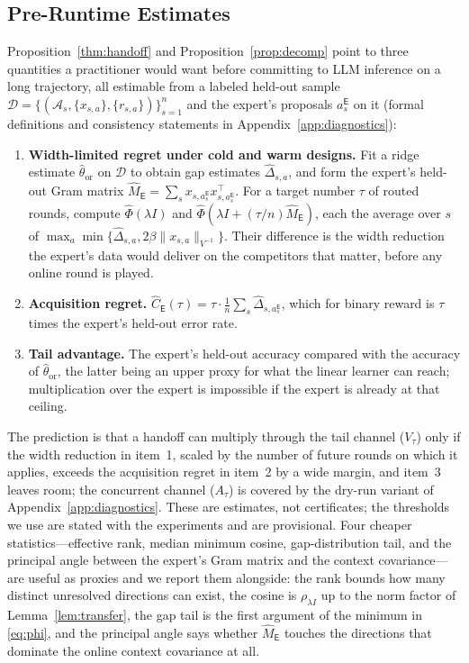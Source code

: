 \documentclass{article}
\theoremstyle{definition}
\theoremstyle{remark}
\theoremstyle{remark}
\newcommand{\Exp}{\mathsf{E}}
\begin{document}
\subsection{Pre-Runtime Estimates}
\label{sec:diagnostics}

Proposition~\ref{thm:handoff} and Proposition~\ref{prop:decomp} point to three
quantities a practitioner would want before committing to LLM inference on a
long trajectory, all estimable from a labeled held-out sample
$\mathcal D=\{(\mathcal A_s,\{x_{s,a}\},\{r_{s,a}\})\}_{s=1}^{n}$ and the
expert's proposals $a_s^{\Exp}$ on it (formal definitions and consistency
statements in Appendix~\ref{app:diagnostics}):
\begin{enumerate}[itemsep=1pt,topsep=1pt,leftmargin=*]
\item \textbf{Width-limited regret under cold and warm designs.} Fit a ridge
estimate $\widehat\theta_{\mathrm{or}}$ on $\mathcal D$ to obtain gap estimates
$\widehat\Delta_{s,a}$, and form the expert's held-out Gram matrix
$\widehat M_{\Exp}=\sum_sx_{s,a_s^{\Exp}}x_{s,a_s^{\Exp}}^\top$. For a target
number $\tau$ of routed rounds, compute
$\widehat\Phi(\lambda I)$ and $\widehat\Phi(\lambda I+(\tau/n)\widehat M_{\Exp})$,
each the average over $s$ of
$\max_a\min\{\widehat\Delta_{s,a},2\beta\|x_{s,a}\|_{V^{-1}}\}$. Their difference
is the width reduction the expert's data would deliver on the competitors
that matter, before any online round is played.
\item \textbf{Acquisition regret.} $\widehat C_{\Exp}(\tau)=\tau\cdot\frac1n\sum_s\widehat\Delta_{s,a_s^{\Exp}}$,
which for binary reward is $\tau$ times the expert's held-out error rate.
\item \textbf{Tail advantage.} The expert's held-out accuracy compared with
the accuracy of $\widehat\theta_{\mathrm{or}}$, the latter being an upper
proxy for what the linear learner can reach; multiplication over the expert
is impossible if the expert is already at that ceiling.
\end{enumerate}
The prediction is that a handoff can multiply through the tail channel
($V_\tau$) only if the width reduction in item~1, scaled by the number of
future rounds on which it applies, exceeds the acquisition regret in item~2
by a wide margin, and item~3 leaves room; the concurrent channel ($A_\tau$)
is covered by the dry-run variant of Appendix~\ref{app:diagnostics}.
These are estimates, not certificates; the thresholds we use are stated with
the experiments and are provisional. Four cheaper statistics---effective
rank, median minimum cosine, gap-distribution tail, and the principal angle
between the expert's Gram matrix and the context covariance---are useful as
proxies and we report them alongside:
the rank bounds how many distinct unresolved directions can exist, the cosine
is $\rho_{\lambda I}$ up to the norm factor of Lemma~\ref{lem:transfer}, the
gap tail is the first argument of the minimum in \eqref{eq:phi}, and the
principal angle says whether $\widehat M_{\Exp}$ touches the directions that
dominate the online context covariance at all.
\end{document}
